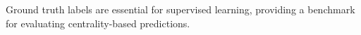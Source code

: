 \documentclass[preview]{standalone}
\begin{document}
Ground truth labels are essential for supervised learning, providing a benchmark for evaluating centrality-based predictions.\\
\end{document}
